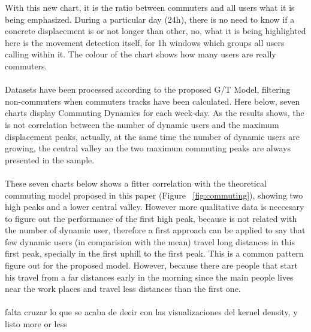 With this new chart, it is the ratio between commuters and all users what it is being emphasized. During a particular day (24h), there is no need to know if a concrete displacement is or not longer than other, no, what it is being highlighted here is the movement detection itself, for 1h windows which groups all users calling within it. The colour of the chart shows how many users are really commuters.
\\
\\
Datasets have been processed according to the proposed G/T Model, filtering non-commuters when commuters tracks have been calculated. Here below, seven charts display Commuting Dynamics for each week-day.
As the results shows, the is not correlation between the number of dynamic users and the maximum displacement peaks, actually, at the same time the number of dynamic users are growing, the central valley an the two maximum commuting peaks are always presented in the sample.
\\
\\
These seven charts below shows a fitter correlation with the theoretical commuting model proposed in this paper (Figure ~\ref{fig:commuting}), showing two high peaks and a lower central valley. However more qualitative data is neccesary to figure out the performance of the first high peak, because is not related with the number of dynamic user, therefore a first approach can be applied to say that few dynamic users (in comparision with the mean) travel long distances in this first peak, specially in  the first uphill to the first peak. This is a common pattern figure out for the proposed model. However, because there are people that start his travel from a far distances early in the morning since the main people lives near the work places and travel less distances than the first one.  
\\
\\
 {\color{red} falta cruzar lo que se acaba de decir con las visualizaciones del kernel density, y listo more or less}


